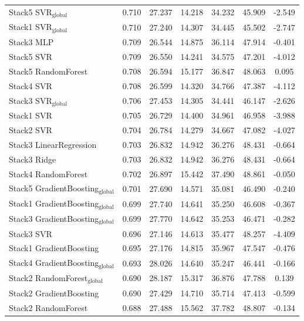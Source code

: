 \begin{table}[tp]
{\begin{tabular}{p{4.5cm}cccccc}
        Stack5 SVR$_{\text{global}}$ & 0.710 & 27.237 & 14.218 & 34.232 & 45.909 & -2.549 \\
        Stack1 SVR$_{\text{global}}$ & 0.710 & 27.240 & 14.307 & 34.445 & 45.502 & -2.747 \\
        Stack3 MLP & 0.709 & 26.544 & 14.875 & 36.114 & 47.914 & -0.401 \\
        Stack5 SVR & 0.709 & 26.550 & 14.241 & 34.575 & 47.201 & -4.012 \\
        Stack5 RandomForest & 0.708 & 26.594 & 15.177 & 36.847 & 48.063 & 0.095 \\
        Stack4 SVR & 0.708 & 26.599 & 14.320 & 34.766 & 47.387 & -4.112 \\
        Stack3 SVR$_{\text{global}}$ & 0.706 & 27.453 & 14.305 & 34.441 & 46.147 & -2.626 \\
        Stack1 SVR & 0.705 & 26.729 & 14.400 & 34.961 & 46.958 & -3.988 \\
        Stack2 SVR & 0.704 & 26.784 & 14.279 & 34.667 & 47.082 & -4.027 \\
        Stack3 LinearRegression & 0.703 & 26.832 & 14.942 & 36.276 & 48.431 & -0.664 \\
        Stack3 Ridge & 0.703 & 26.832 & 14.942 & 36.276 & 48.431 & -0.664 \\
        Stack4 RandomForest & 0.702 & 26.897 & 15.442 & 37.490 & 48.861 & -0.050 \\
        Stack5 GradientBoosting$_{\text{global}}$ & 0.701 & 27.690 & 14.571 & 35.081 & 46.490 & -0.240 \\
        Stack1 GradientBoosting$_{\text{global}}$ & 0.699 & 27.740 & 14.641 & 35.250 & 46.608 & -0.367 \\
        Stack3 GradientBoosting$_{\text{global}}$ & 0.699 & 27.770 & 14.642 & 35.253 & 46.471 & -0.282 \\
        Stack3 SVR & 0.696 & 27.146 & 14.613 & 35.477 & 48.257 & -4.409 \\
        Stack1 GradientBoosting & 0.695 & 27.176 & 14.815 & 35.967 & 47.547 & -0.476 \\
        Stack4 GradientBoosting$_{\text{global}}$ & 0.693 & 28.026 & 14.640 & 35.247 & 46.441 & -0.166 \\
        Stack2 RandomForest$_{\text{global}}$ & 0.690 & 28.187 & 15.317 & 36.876 & 47.788 & 0.139 \\
        Stack2 GradientBoosting & 0.690 & 27.429 & 14.710 & 35.714 & 47.413 & -0.599 \\
        Stack2 RandomForest & 0.688 & 27.488 & 15.562 & 37.782 & 48.807 & -0.134 \\

\end{tabular}}
\end{table}
